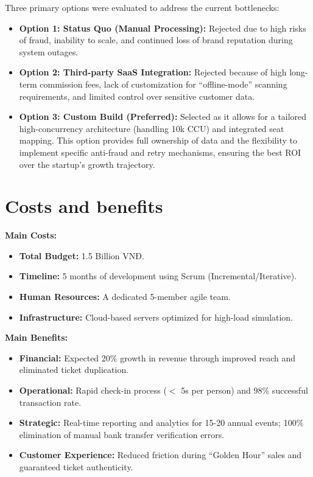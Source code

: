 Three primary options were evaluated to address the current bottlenecks:
\begin{itemize}
    \item \textbf{Option 1: Status Quo (Manual Processing):} Rejected due to high risks of fraud, inability to scale, and continued loss of brand reputation during system outages.
    \item \textbf{Option 2: Third-party SaaS Integration:} Rejected because of high long-term commission fees, lack of customization for ``offline-mode'' scanning requirements, and limited control over sensitive customer data.
    \item \textbf{Option 3: Custom Build (Preferred):} Selected as it allows for a tailored high-concurrency architecture (handling 10k CCU) and integrated seat mapping. This option provides full ownership of data and the flexibility to implement specific anti-fraud and retry mechanisms, ensuring the best ROI over the startup's growth trajectory.
\end{itemize}

\section{Costs and benefits}

\textbf{Main Costs:}
\begin{itemize}
    \item \textbf{Total Budget:} 1.5 Billion VNĐ.
    \item \textbf{Timeline:} 5 months of development using Scrum (Incremental/Iterative).
    \item \textbf{Human Resources:} A dedicated 5-member agile team.
    \item \textbf{Infrastructure:} Cloud-based servers optimized for high-load simulation.
\end{itemize}

\textbf{Main Benefits:}
\begin{itemize}
    \item \textbf{Financial:} Expected 20\% growth in revenue through improved reach and eliminated ticket duplication.
    \item \textbf{Operational:} Rapid check-in process ($<$ 5s per person) and 98\% successful transaction rate.
    \item \textbf{Strategic:} Real-time reporting and analytics for 15-20 annual events; 100\% elimination of manual bank transfer verification errors.
    \item \textbf{Customer Experience:} Reduced friction during ``Golden Hour'' sales and guaranteed ticket authenticity.
\end{itemize}